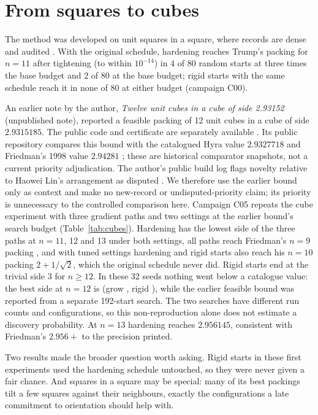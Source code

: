 \section{From squares to cubes}\label{sec:story}
The method was developed on unit squares in a square, where records are dense and audited \citep{squaresproject,friedmansurvey}. With the original schedule, hardening reaches Trump's packing for $n=11$ \citep{trump} after tightening (to within $10^{-14}$) in 4 of 80 random starts at three times the base budget and 2 of 80 at the base budget; rigid starts with the same schedule reach it in none of 80 at either budget (campaign C00).

An earlier note by the author, \emph{Twelve unit cubes in a cube of side 2.93152} (unpublished note), reported a feasible packing of 12 unit cubes in a cube of side $2.9315185$. The public code and certificate are separately available \citep{softtorigidpacking}. Its public repository compares this bound with the catalogued Hyra value $2.9327718$ and Friedman's 1998 value $2.94281$ \citep{hyra,friedmancubes}; these are historical comparator snapshots, not a current priority adjudication. The author's public build log flags novelty relative to Haowei Lin's arrangement as disputed \citep{prioritycontext2026}. We therefore use the earlier bound only as context and make no new-record or undisputed-priority claim; its priority is unnecessary to the controlled comparison here. Campaign C05 repeats the cube experiment with three gradient paths and two settings at the earlier bound's search budget (Table~\ref{tab:cubes}). Hardening has the lowest side of the three paths at $n=11$, 12 and 13 under both settings, all paths reach Friedman's $n=9$ packing \citep{friedmancubes}, and with tuned settings hardening and rigid starts also reach his $n=10$ packing $2+1/\sqrt2$, which the original schedule never did. Rigid starts end at the trivial side 3 for $n\ge12$. In these 32 seeds nothing went below a catalogue value: the best side at $n=12$ is \CubesHardenTwelve{} (grow \CubesGrowTwelve, rigid \CubesRigidTwelve), while the earlier feasible bound was reported from a separate 192-start search. The two searches have different run counts and configurations, so this non-reproduction alone does not estimate a discovery probability. At $n=13$ hardening reaches $2.956145$, consistent with Friedman's $2.956+$ \citep{friedmancubes} to the precision printed.



Two results made the broader question worth asking. Rigid starts in these first experiments used the hardening schedule untouched, so they were never given a fair chance. And squares in a square may be special: many of its best packings tilt a few squares against their neighbours, exactly the configurations a late commitment to orientation should help with.
